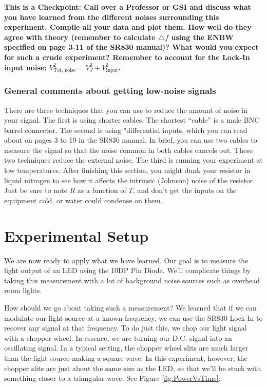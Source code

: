 \documentclass{../lab}
\begin{document}
\textbf{This is a Checkpoint:  Call over a Professor or GSI and discuss what you have learned from the different noises surrounding this experiment. Compile all your data and plot them.  How well do they agree with theory (remember to calculate $\triangle f$ using the ENBW specified on page 3-11 of the SR830 manual)? What would you expect for such a crude experiment? Remember to account for the Lock-In input noise: $V_\text{Tot, noise}^2 = V_J^2 + V_\text{Input}^2$.}

\subsubsection{General comments about getting low-noise signals}

There are three techniques that you can use to reduce the amount of noise in your signal. The first is using shorter cables. The shortest ``cable'' is a male BNC barrel connector. The second is using "differential inputs, which you can read about on pages 3 to 19 in the SR830 manual. In brief, you can use two cables to measure the signal so that the noise common in both cables cancels out. These two techniques reduce the external noise. The third is running your experiment at low temperatures. After finishing this section, you might dunk your resistor in liquid nitrogen to see how it affects the intrinsic (Johnson) noise of the resistor. Just be sure to note $R$ as a function of $T$, and don't get the inputs on the equipment cold, or water could condense on them.

\section{Experimental Setup}

We are now ready to apply what we have learned. Our goal is to measure the light output of an LED using the 10DP Pin Diode. We'll complicate things by taking this measurement with a lot of background noise sources such as overhead room lights.

How should we go about taking such a measurement? We learned that if we can modulate our light source at a known frequency, we can use the SR830 Lock-In to recover any signal at that frequency. To do just this, we chop our light signal with a chopper wheel. In essence, we are turning our D.C. signal into an oscillating signal. In a typical setting, the chopper wheel slits are much larger than the light source-making a square wave. In this experiment, however, the chopper slits are just about the same size as the LED, so that we'll be stuck with something closer to a triangular wave. See Figure \ref{fig:PowerVsTime}:
\end{document}

